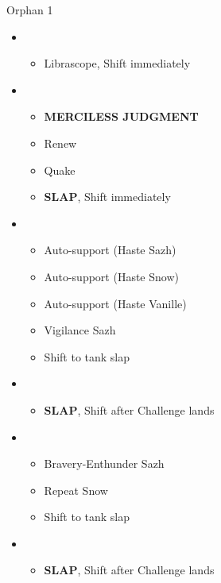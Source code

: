 \begin{battle}{Orphan 1}
  \begin{multicols}{2}
    \begin{itemize}
      \item \second
            \begin{itemize}
              \item Librascope, Shift immediately
            \end{itemize}
      \item \third
            \begin{itemize}
              \item \textbf{MERCILESS JUDGMENT}
              \item Renew
              \item Quake
              \item \textbf{SLAP}, Shift immediately
            \end{itemize}
      \item \fourth
            \begin{itemize}
              \item Auto-support (Haste Sazh)
              \item Auto-support (Haste Snow)
              \item Auto-support (Haste Vanille)
              \item Vigilance Sazh
              \item Shift to tank slap
            \end{itemize}
      \item \third
            \begin{itemize}
              \item \textbf{SLAP}, Shift after Challenge lands
            \end{itemize}
      \item \fourth
            \begin{itemize}
              \item Bravery-Enthunder Sazh
              \item Repeat Snow
              \item Shift to tank slap
            \end{itemize}
      \item \third
            \begin{itemize}
              \item \textbf{SLAP}, Shift after Challenge lands
            \end{itemize}

\end{itemize}
\end{multicols}
\end{battle}
